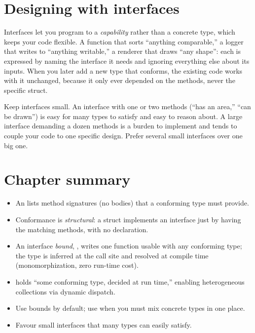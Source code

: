 \section{Designing with interfaces}

Interfaces let you program to a \emph{capability} rather than a concrete type,
which keeps your code flexible. A function that sorts ``anything comparable,'' a
logger that writes to ``anything writable,'' a renderer that draws ``any
shape'': each is expressed by naming the interface it needs and ignoring
everything else about its inputs. When you later add a new type that conforms, the
existing code works with it unchanged, because it only ever depended on the
methods, never the specific struct.

\begin{tip}
Keep interfaces small. An interface with one or two methods (``has an area,''
``can be drawn'') is easy for many types to satisfy and easy to reason about. A
large interface demanding a dozen methods is a burden to implement and tends to
couple your code to one specific design. Prefer several small interfaces over one
big one.
\end{tip}

\section{Chapter summary}

\begin{itemize}[leftmargin=1.4em]
  \item An  lists method signatures (no bodies) that a conforming
        type must provide.
  \item Conformance is \emph{structural}: a struct implements an interface just by
        having the matching methods, with no  declaration.
  \item An interface \emph{bound}, , writes one
        function usable with any conforming type; the type is inferred at the call
        site and resolved at compile time (monomorphization, zero run-time cost).
  \item {} holds ``some conforming type, decided at run time,''
        enabling heterogeneous collections via dynamic dispatch.
  \item Use bounds by default; use  when you must mix concrete types in
        one place.
  \item Favour small interfaces that many types can easily satisfy.
\end{itemize}

